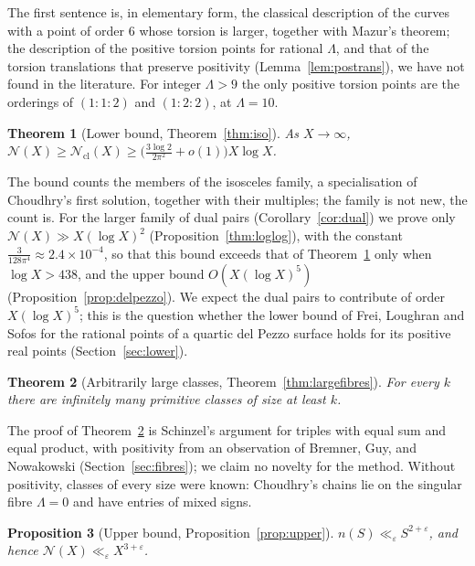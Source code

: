 \documentclass[10pt]{article}
\newcommand{\N}{\mathcal{N}}
\newcommand{\Ncl}{\mathcal{N}_{\mathrm{cl}}}
\newtheorem{introthm}{Theorem}
\newtheorem{introprop}[introthm]{Proposition}
\begin{document}
The first sentence is, in elementary form, the classical description of the curves with a point of order $6$ whose torsion is larger, together with Mazur's theorem; the description of the positive torsion points for rational $\Lambda$, and that of the torsion translations that preserve positivity (Lemma~\ref{lem:postrans}), we have not found in the literature. For integer $\Lambda>9$ the only positive torsion points are the orderings of $(1:1:2)$ and $(1:2:2)$, at $\Lambda=10$.

\begin{introthm}[Lower bound, Theorem~\ref{thm:iso}]\label{thm:A}
As $X\to\infty$, $\N(X)\ge\Ncl(X)\ge\big(\frac{3\log2}{2\pi^2}+o(1)\big)X\log X$.
\end{introthm}

The bound counts the members of the isosceles family, a specialisation of Choudhry's first solution, together with their multiples; the family is not new, the count is. For the larger family of dual pairs (Corollary~\ref{cor:dual}) we prove only $\N(X)\gg X(\log X)^2$ (Proposition~\ref{thm:loglog}), with the constant $\frac3{128\pi^4}\approx2.4\times10^{-4}$, so that this bound exceeds that of Theorem~\ref{thm:A} only when $\log X>438$, and the upper bound $O(X(\log X)^5)$ (Proposition~\ref{prop:delpezzo}). We expect the dual pairs to contribute of order $X(\log X)^5$; this is the question whether the lower bound of Frei, Loughran and Sofos for the rational points of a quartic del Pezzo surface holds for its positive real points (Section~\ref{sec:lower}).

\begin{introthm}[Arbitrarily large classes, Theorem~\ref{thm:largefibres}]\label{thm:B}
For every $k$ there are infinitely many primitive classes of size at least $k$.
\end{introthm}

The proof of Theorem~\ref{thm:B} is Schinzel's argument for triples with equal sum and equal product, with positivity from an observation of Bremner, Guy, and Nowakowski (Section~\ref{sec:fibres}); we claim no novelty for the method. Without positivity, classes of every size were known: Choudhry's chains \cite[\S5.1, (52)--(55)]{choudhry2011} lie on the singular fibre $\Lambda=0$ and have entries of mixed signs.

\begin{introprop}[Upper bound, Proposition~\ref{prop:upper}]\label{prop:C}
$n(S)\ll_\varepsilon S^{2+\varepsilon}$, and hence $\N(X)\ll_\varepsilon X^{3+\varepsilon}$.
\end{introprop}
\end{document}
